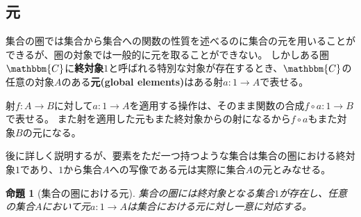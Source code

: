 \documentclass[uplatex,dvipdfmx]{jsarticle}
\newcommand{\cat}[1]{\mathbbm{#1}}
\newcommand{\arrow}{\rightarrow}
\newcommand{\mor}[3]{#1:#2\arrow #3}
\newtheorem{prop}[proof]{命題}
\numberwithin{proof}{subsection}
\begin{document}
	\subsection{元}
		集合の圏では集合から集合への関数の性質を述べるのに集合の元を用いることができるが、圏の対象では一般的に元を取ることができない。
		しかしある圏$\cat{C}$に\textbf{終対象}$1$と呼ばれる特別な対象が存在するとき、$\cat{C}$の任意の対象$A$のある\textbf{元(global elements)}はある射$\mor{a}{1}{A}$で表せる。
		\begin{center}
		\end{center}

		射$\mor{f}{A}{B}$に対して$\mor{a}{1}{A}$を適用する操作は、そのまま関数の合成$\mor{f\circ a}{1}{B}$で表せる。
		また射を適用した元もまた終対象からの射になるから$f\circ a$もまた対象$B$の元になる。

		後に詳しく説明するが、要素をただ一つ持つような集合は集合の圏における終対象$1$であり、$1$から集合$A$への写像である元は実際に集合$A$の元とみなせる。
		\begin{prop}[集合の圏における元]
			集合の圏には終対象となる集合$1$が存在し、任意の集合$A$において元$\mor{a}{1}{A}$は集合における元に対し一意に対応する。
		\end{prop}
\end{document}

